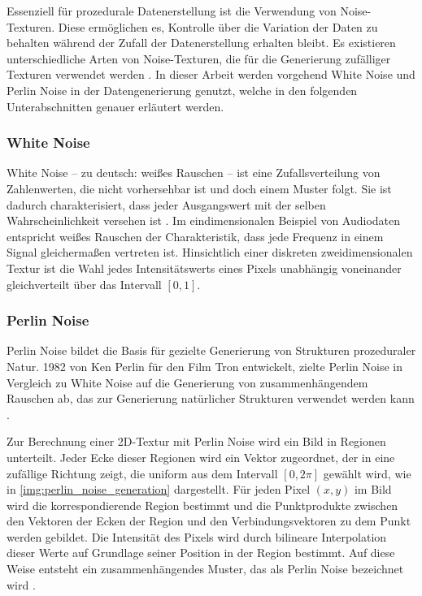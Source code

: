 Essenziell für prozedurale Datenerstellung ist die Verwendung von Noise-Texturen. Diese ermöglichen es, Kontrolle über die Variation der Daten zu behalten während der Zufall der Datenerstellung erhalten bleibt. Es existieren unterschiedliche Arten von Noise-Texturen, die für die Generierung zufälliger Texturen verwendet werden \cite{noise_generation}. In dieser Arbeit werden vorgehend White Noise und Perlin Noise in der Datengenerierung genutzt, welche in den folgenden Unterabschnitten genauer erläutert werden.

\subsubsection{White Noise}

White Noise -- zu deutsch: weißes Rauschen -- ist eine Zufallsverteilung von Zahlenwerten, die nicht vorhersehbar ist und doch einem Muster folgt. Sie ist dadurch charakterisiert, dass jeder Ausgangswert mit der selben Wahrscheinlichkeit versehen ist \cite{white_noise}. Im eindimensionalen Beispiel von Audiodaten entspricht weißes Rauschen der Charakteristik, dass jede Frequenz in einem Signal gleichermaßen vertreten ist. Hinsichtlich einer diskreten zweidimensionalen Textur ist die Wahl jedes Intensitätswerts eines Pixels unabhängig voneinander gleichverteilt über das Intervall $[0, 1]$.

\subsubsection{Perlin Noise}

Perlin Noise bildet die Basis für gezielte Generierung von Strukturen prozeduraler Natur. 1982 von Ken Perlin für den Film Tron entwickelt, zielte Perlin Noise in Vergleich zu White Noise auf die Generierung von zusammenhängendem Rauschen ab, das zur Generierung natürlicher Strukturen verwendet werden kann \cite{perlin_noise_original,perlin_noise_extension}.

Zur Berechnung einer 2D-Textur mit Perlin Noise wird ein Bild in Regionen unterteilt. Jeder Ecke dieser Regionen wird ein Vektor zugeordnet, der in eine zufällige Richtung zeigt, die uniform aus dem Intervall $[0, 2\pi]$ gewählt wird, wie in \autoref{img:perlin_noise_generation} dargestellt. Für jeden Pixel $(x, y)$ im Bild wird die korrespondierende Region bestimmt und die Punktprodukte zwischen den Vektoren der Ecken der Region und den Verbindungsvektoren zu dem Punkt werden gebildet. Die Intensität des Pixels wird durch bilineare Interpolation dieser Werte auf Grundlage seiner Position in der Region bestimmt. Auf diese Weise entsteht ein zusammenhängendes Muster, das als Perlin Noise bezeichnet wird \cite{perlin_noise_original}.

